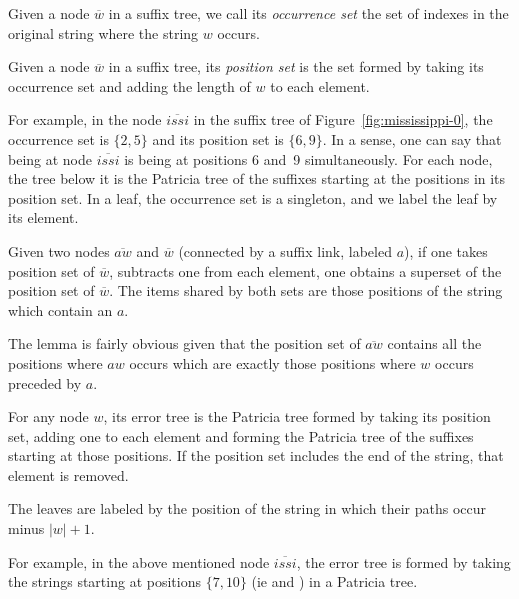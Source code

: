 \begin{definition}
Given a node $\overline{w}$ in a suffix tree, we call its \emph{occurrence set} the set of indexes in the original string where the string $w$ occurs.

Given a node $\overline{w}$ in a suffix tree, its \emph{position set} is the set formed by taking its occurrence set and adding the length of $w$ to each element.
\end{definition}

For example, in the node $\overline{issi}$ in the suffix tree of Figure~\ref{fig:mississippi-0}, the occurrence set is $\{2, 5\}$ and its position set is $\{6, 9\}$. In a sense, one can say that being at node $\overline{issi}$ is being at positions 6 and~9 simultaneously. For each node, the tree below it is the Patricia tree of the suffixes starting at the positions in its position set. In a leaf, the occurrence set is a singleton, and we label the leaf by its element.

\begin{lemma}\label{lemma:suffix-error}
Given two nodes $\overline{aw}$ and $\overline{w}$ (connected by a suffix link, labeled $a$), if one takes position set of $\overline{w}$, subtracts one from each element, one obtains a superset of the position set of $\overline{w}$. The items shared by both sets are those positions of the string which contain an $a$.
\end{lemma}

The lemma is fairly obvious given that the position set of $\overline{aw}$ contains all the positions where $aw$ occurs which are exactly those positions where $w$ occurs preceded by $a$.

\begin{definition}
For any node $w$, its error tree is the Patricia tree formed by taking its position set, adding one to each element and forming the Patricia tree of the suffixes starting at those positions. If the position set includes the end of the string, that element is removed.

The leaves are labeled by the position of the string in which their paths occur minus $|w| + 1$.
\end{definition}

For example, in the above mentioned node $\overline{issi}$, the error tree is formed by taking the strings starting at positions $\{7, 10\}$ (ie  and ) in a Patricia tree.

